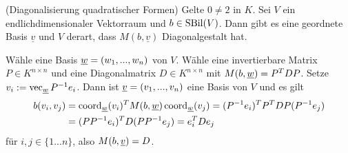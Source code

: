 \documentclass[../../main.tex]{subfiles}
\begin{document}
\begin{kor}\label{13.5.12} (Diagonalisierung quadratischer Formen) Gelte $0\neq 2$ in $K$. Sei $V$ ein endlichdimensionaler Vektorraum und $b\in \operatorname{SBil}(V)$. Dann gibt es eine geordnete Basis $\underline{v}$ und $V$ derart, dass $M(b,\underline{v})$ Diagonalgestalt hat.
\end{kor}
\begin{cproof}
Wähle eine Basis ${\underline w}=(w_1,...,w_n)$ von $V$. Wähle eine invertierbare Matrix $P\in K^{n\times n}$ und eine Diagonalmatrix $D\in K^{n\times n}$ mit $M(b,{\underline w})=P^TDP$. Setze $v_i:=\operatorname{vec}_{{\underline w}} P^{-1}e_i$. Dann ist ${\underline v}=(v_1,...,v_n)$ eine Basis von $V$ und es gilt
\begin{align*}
b(v_i,v_j)&=\operatorname{coord}_{{\underline w}}(v_i)^T M(b,{\underline w})\operatorname{coord}_{{\underline w}}(v_j)=(P^{-1}e_i)^TP^TDP(P^{-1}e_j)\\
&=(PP^{-1}e_i)^TD(PP^{-1}e_j)=e_i^TDe_j
\end{align*}
für $i,j\in\{1...n\}$, also $M(b,{\underline v})=D$.
\end{cproof}
\end{document}
